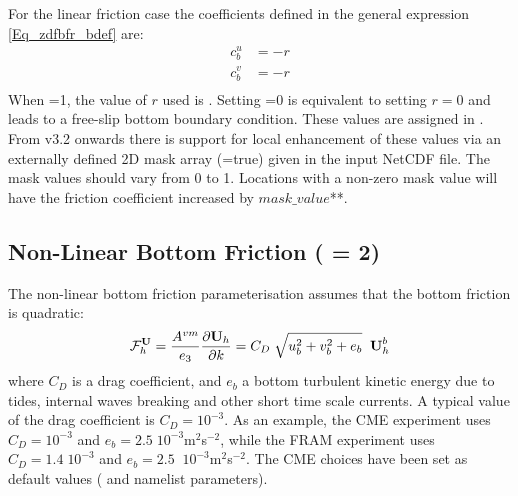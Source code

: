 \documentclass[NEMO_book]{subfiles}
\begin{document}
For the linear friction case the coefficients defined in the general 
expression \eqref{Eq_zdfbfr_bdef} are: 
\begin{equation} \label{Eq_zdfbfr_linbfr_b}
\begin{split}
 c_b^u &= - r\\
 c_b^v &= - r\\
\end{split}
\end{equation}
When =1, the value of $r$ used is . 
Setting =0 is equivalent to setting $r=0$ and leads to a free-slip 
bottom boundary condition. These values are assigned in . 
From v3.2 onwards there is support for local enhancement of these values 
via an externally defined 2D mask array (=true) given
in the  input NetCDF file. The mask values should vary from 0 to 1. 
Locations with a non-zero mask value will have the friction coefficient increased 
by $mask\_value$**.

\subsection{Non-Linear Bottom Friction ( = 2)}
\label{ZDF_bfr_nonlinear}

The non-linear bottom friction parameterisation assumes that the bottom 
friction is quadratic: 
\begin{equation} \label{Eq_zdfbfr_nonlinear}
{\cal F}_h^\textbf{U} = \frac{A^{vm}}{e_3 }\frac{\partial \textbf {U}_h 
}{\partial k}=C_D \;\sqrt {u_b ^2+v_b ^2+e_b } \;\; \textbf {U}_h^b 
\end{equation}
where $C_D$ is a drag coefficient, and $e_b $ a bottom turbulent kinetic energy 
due to tides, internal waves breaking and other short time scale currents. 
A typical value of the drag coefficient is $C_D = 10^{-3} $. As an example, 
the CME experiment \citep{Treguier_JGR92} uses $C_D = 10^{-3}$ and 
$e_b = 2.5\;10^{-3}$m$^2$\;s$^{-2}$, while the FRAM experiment \citep{Killworth1992} 
uses $C_D = 1.4\;10^{-3}$ and $e_b =2.5\;\;10^{-3}$m$^2$\;s$^{-2}$. 
The CME choices have been set as default values ( and  
namelist parameters).
\end{document}
